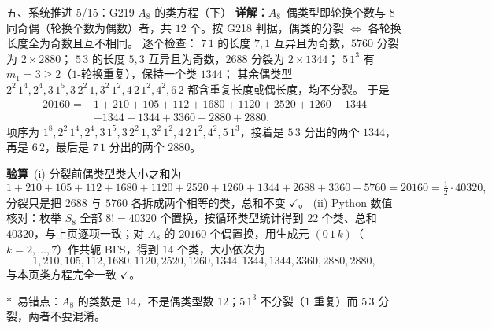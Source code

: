 \documentclass[aspectratio=169,10pt,fontset=none]{ctexbeamer}
\newcommand{\key}[1]{\textcolor{ink}{\bfseries #1}}
\newcommand{\starpt}{\textcolor{accent}{\bfseries$\ast$}}
\begin{document}
\begin{frame}[t]{五、系统推进 5/15：G219 $A_8$ 的类方程（下）}
\scriptsize
\key{详解：$A_8$}\ 偶类型即轮换个数与 $8$ 同奇偶（轮换个数为偶数）者，共 $12$ 个。按 G218 判据，偶类的分裂 $\iff$ 各轮换长度全为奇数且互不相同。
逐个检查：
$7\,1$ 的长度 $7,1$ 互异且为奇数，$5760$ 分裂为 $2\times 2880$；
$5\,3$ 的长度 $5,3$ 互异且为奇数，$2688$ 分裂为 $2\times 1344$；
$5\,1^3$ 有 $m_1=3\ge2$（$1$-轮换重复），保持一个类 $1344$；
其余偶类型 $2^2\,1^4,2^4,3\,1^5,3\,2^2\,1,3^2\,1^2,4\,2\,1^2,4^2,6\,2$ 都含重复长度或偶长度，均不分裂。
于是
\[
\begin{aligned}
20160={}&1+210+105+112+1680+1120+2520+1260+1344\\
&+1344+1344+3360+2880+2880.
\end{aligned}
\]
项序为 $1^8,2^2\,1^4,2^4,3\,1^5,3\,2^2\,1,3^2\,1^2,4\,2\,1^2,4^2,5\,1^3$，接着是 $5\,3$ 分出的两个 $1344$，再是 $6\,2$，最后是 $7\,1$ 分出的两个 $2880$。

\key{验算}\ (i) 分裂前偶类型类大小之和为
\[
1+210+105+112+1680+1120+2520+1260+1344+2688+3360+5760=20160=\tfrac12\cdot 40320,
\]
分裂只是把 $2688$ 与 $5760$ 各拆成两个相等的类，总和不变 $\checkmark$。
(ii) Python 数值核对：枚举 $S_8$ 全部 $8!=40320$ 个置换，按循环类型统计得到 $22$ 个类、总和 $40320$，与上页逐项一致；对 $A_8$ 的 $20160$ 个偶置换，用生成元 $(0\,1\,k)$（$k=2,\dots,7$）作共轭 BFS，得到 $14$ 个类，大小依次为
\[
1,210,105,112,1680,1120,2520,1260,1344,1344,1344,3360,2880,2880,
\]
与本页类方程完全一致 $\checkmark$。

\starpt\ 易错点：$A_8$ 的类数是 $14$，不是偶类型数 $12$；$5\,1^3$ 不分裂（$1$ 重复）而 $5\,3$ 分裂，两者不要混淆。
\end{frame}
\end{document}
